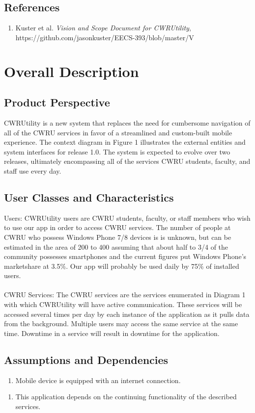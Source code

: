 \documentclass[pdftex,12pt,letter]{article}
\begin{document}
\subsection{References}
\begin{enumerate}[1.]
\item Kuster et al. \emph{Vision and Scope Document for CWRUtility}, https://github.com/jasonkuster/EECS-393/blob/master/V%
\end{enumerate}

\section{Overall Description}
\subsection{Product Perspective}
CWRUtility is a new system that replaces the need for cumbersome navigation of all of the CWRU services in favor of a streamlined and custom-built mobile experience. The context diagram in Figure 1 illustrates the external entities and system interfaces for release 1.0. The system is expected to evolve over two releases, ultimately encompassing all of the services CWRU students, faculty, and staff use every day.
\subsection{User Classes and Characteristics}
\noindent Users: CWRUtility users are CWRU students, faculty, or staff members who wish to use our app in order to access CWRU services. The number of people at CWRU who possess Windows Phone 7/8 devices is is unknown, but can be estimated in the area of 200 to 400 assuming that about half to 3/4 of the community possesses smartphones and the current figures put Windows Phone's marketshare at 3.5\%. Our app will probably be used daily by 75\% of installed users.\\\\
CWRU Services:  The CWRU services are the services enumerated in Diagram 1 with which CWRUtility will have active communication. These services will be accessed several times per day by each instance of the application as it pulls data from the background. Multiple users may access the same service at the same time. Downtime in a service will result in downtime for the application.
\subsection{Assumptions and Dependencies}
\begin{enumerate}[{A}S-1:]
\item Mobile device is equipped with an internet connection.
\end{enumerate}
\begin{enumerate}[DE-1:]
\item This application depends on the continuing functionality of the described services.
\end{enumerate}
\end{document}
